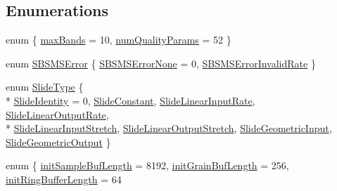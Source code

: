 \subsection*{Enumerations}
\begin{DoxyCompactItemize}
\item 
enum \{ \hyperlink{namespace__sbsms___aaa516460bd9d3c383bcfcb40a48a1927a94c27d17dd5dcbd2a58d6b9631e0b887}{max\+Bands} = 10, 
\hyperlink{namespace__sbsms___aaa516460bd9d3c383bcfcb40a48a1927a29eaac429fafe4b80e64d0a61d389f8d}{num\+Quality\+Params} = 52
 \}
\item 
enum \hyperlink{namespace__sbsms___af8e4cc216d7a51d2de2c5ce55eb3ce19}{S\+B\+S\+M\+S\+Error} \{ \hyperlink{namespace__sbsms___af8e4cc216d7a51d2de2c5ce55eb3ce19a8fbdd0e40a53c09a620a9e018b6ef538}{S\+B\+S\+M\+S\+Error\+None} = 0, 
\hyperlink{namespace__sbsms___af8e4cc216d7a51d2de2c5ce55eb3ce19a67c97867cfbf93d02974e65dcb5a7749}{S\+B\+S\+M\+S\+Error\+Invalid\+Rate}
 \}
\item 
enum \hyperlink{namespace__sbsms___a208fc16133e115cda214f563a3a19a49}{Slide\+Type} \{ \\*
\hyperlink{namespace__sbsms___a208fc16133e115cda214f563a3a19a49ad443e866ca563c3297a40c5f4fdbb690}{Slide\+Identity} = 0, 
\hyperlink{namespace__sbsms___a208fc16133e115cda214f563a3a19a49a380a96a0990704566ac50b5015935912}{Slide\+Constant}, 
\hyperlink{namespace__sbsms___a208fc16133e115cda214f563a3a19a49a7e8bb24989e8925fc9aad7352dab05e6}{Slide\+Linear\+Input\+Rate}, 
\hyperlink{namespace__sbsms___a208fc16133e115cda214f563a3a19a49a94d9af29d5ae0e516a6e971b996b54e5}{Slide\+Linear\+Output\+Rate}, 
\\*
\hyperlink{namespace__sbsms___a208fc16133e115cda214f563a3a19a49adf82bf20fef90ffb2d70f618ec0119d9}{Slide\+Linear\+Input\+Stretch}, 
\hyperlink{namespace__sbsms___a208fc16133e115cda214f563a3a19a49a8ddd70e9e4a8640099df04820893f3d8}{Slide\+Linear\+Output\+Stretch}, 
\hyperlink{namespace__sbsms___a208fc16133e115cda214f563a3a19a49a33f435c9f459adba9ad4aa5c1c68f3d6}{Slide\+Geometric\+Input}, 
\hyperlink{namespace__sbsms___a208fc16133e115cda214f563a3a19a49afc2f2e06d37f335fa8cc38452f4b858b}{Slide\+Geometric\+Output}
 \}
\item 
enum \{ \hyperlink{namespace__sbsms___a0f3a6108ed09fbce6d59ddd4b6c16eb9a700c9db0402f1e08e0c2190d058d22c5}{init\+Sample\+Buf\+Length} = 8192, 
\hyperlink{namespace__sbsms___a0f3a6108ed09fbce6d59ddd4b6c16eb9a88db0a73f6c7acf02c09a118ac5a9ed0}{init\+Grain\+Buf\+Length} = 256, 
\hyperlink{namespace__sbsms___a0f3a6108ed09fbce6d59ddd4b6c16eb9abbb424ae18a21f10670b7685bcaaed5a}{init\+Ring\+Buffer\+Length} = 64

\end{DoxyCompactItemize}

